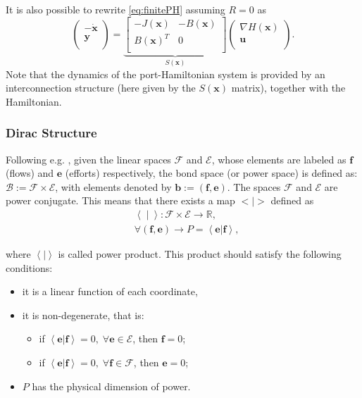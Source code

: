 \documentclass[preprint,12pt]{elsarticle}
\begin{document}
It is also possible to rewrite \eqref{eq:finitePH} assuming $R = 0$ as
\begin{equation}
\label{eq:Smatrix}
\begin{pmatrix}
-\dot{ \bm{x} }\\
\bm{y} \\
\end{pmatrix} = 
\underbrace{\begin{bmatrix}
-J(\bm{x}) & -B(\bm{x}) \\
B(\bm{x})^T & 0 \\
\end{bmatrix}}_{{S}(\bm{x})}
\begin{pmatrix}
\nabla H(\bm{x})\\
\bm{u} \\
\end{pmatrix}.
\end{equation}
Note that the dynamics of the port-Hamiltonian system is provided by an interconnection structure (here given by the ${S}(\bm{x})$ matrix), together with the Hamiltonian.

\subsubsection{Dirac Structure}
Following e.g. \cite{PHbookShaft}, given the linear spaces $\mathcal{F}$ and $\mathcal{E}$, whose elements are labeled as $\bm{f}$ (flows) and $\bm{e}$ (efforts) respectively, the bond space (or power
space) is defined as: $\mathcal{B} := \mathcal{F} \times \mathcal{E}$, with elements denoted by $\bm{b} := (\bm{f}, \bm{e})$. The spaces $\mathcal{F}$ and $\mathcal{E}$ are power conjugate. This means that there exists a map $< \vert >$ defined as
\begin{equation}
\begin{aligned}
& \left\langle \; \vert \; \right\rangle :\mathcal{F} \times \mathcal{E} \rightarrow \mathbb{R}, \\
& \forall (\bm{f}, \bm{e}) \rightarrow P = \left\langle \bm{e} \vert \bm{f} \right\rangle,
\end{aligned}
\end{equation}


where $\left\langle \vert \right\rangle$ is called power product. This product should satisfy the following conditions:
\begin{itemize}
\item it is a linear function of each coordinate,
\item it is non-degenerate, that is:
\begin{itemize}
\item if $\left\langle \bm{e} \vert \bm{f} \right\rangle = 0, \; \forall \bm{e} \in \mathcal{E}$, then $\bm{f} = 0$;
\item if $\left\langle \bm{e} \vert \bm{f} \right\rangle = 0, \; \forall \bm{f} \in \mathcal{F}$, then $\bm{e} = 0$;
\end{itemize}
\item $P$ has the physical dimension of power.
\end{itemize}
\end{document}
